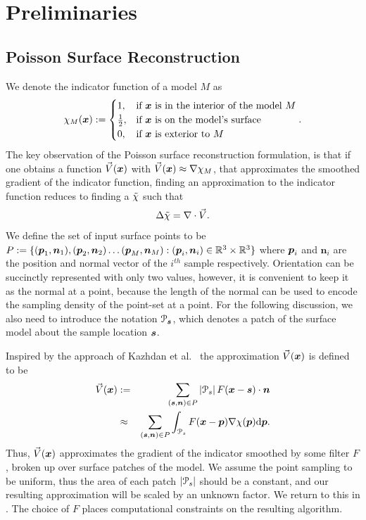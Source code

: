 \section{Preliminaries}\label{sec:pois_review}
\subsection{Poisson Surface Reconstruction}
We denote the indicator function of a model $M$ as $$ \chi_M(\boldsymbol{x}) :=
\begin{cases}
1, & \text{if }\boldsymbol{x}\text{ is in the interior of the model } M \\
\frac{1}{2}, & \text{if } \boldsymbol{x}\text{ is on the model's surface}\\
0, & \text{if }\boldsymbol{x}\text{ is exterior to } M
\end{cases}. $$
The key observation of the Poisson surface reconstruction formulation, is that if one obtains a function $\vec{V}(\boldsymbol{x})$ with $\vec{V}(\boldsymbol{x})\approx{\nabla}\chi_M$, that approximates the smoothed gradient of the indicator function, finding an approximation to the indicator function reduces to finding a $\tilde{\chi}$ such that {\small 
\begin{equation} \label{eq:poisson}
	\lapl{\inda} = {\grad} \cdot \vec{V}.
\end{equation}}
We define the set of input surface points to be $P:=\{(\boldsymbol{p}_1,\boldsymbol{n}_1), (\boldsymbol{p}_2,\boldsymbol{n}_2) \hdots (\boldsymbol{p}_M,\boldsymbol{n}_M) : (\boldsymbol{p}_i,\boldsymbol{n}_i) \in \mathbb{R}^3 \times \mathbb{R}^3 \}$ where $\boldsymbol{p}_i$ and $\mathbf{n}_i$ are the position and normal vector of the $i^{th}$ sample respectively. Orientation can be succinctly represented with only two values, however, it is convenient to keep it as the normal at a point, because the length of the normal can be used to encode the sampling density of the point-set at a point. For the following discussion, we also need to introduce the notation $\mathcal{P}_{\boldsymbol{s}}$, which denotes a patch of the surface model about the sample location $\boldsymbol{s}$. 

Inspired by the approach of Kazhdan et al.~\cite{Kazhdan06} the approximation $\vec{V}(\boldsymbol{x})$ is defined to be  {\small 
\begin{eqnarray}
	\vec{V}(\vx) & := & \sum_{(\vect{s},\vect{n}) \in P}\left|\patch_s\right|F(\vx-\vect{s})\cdot\vn \label{eq:vdef} \\
	 & \approx & \sum_{(\vect{s},\vect{n}) \in P} \int_{\patch_s}{F(\vect{x} - \vect{p}) \nabla \chi (\vect{p})} \mathrm{d} \vect{p}. \notag  
\end{eqnarray}}
Thus, $\vec{V}(\boldsymbol{x})$ approximates the gradient of the indicator smoothed by some filter $F$, broken up over surface patches of the model. We assume the point sampling to be uniform, thus the area of each patch $\left|\mathcal{P}_s\right|$ should be a constant, and our resulting approximation will be scaled by an unknown factor. We return to this in . The choice of $F$ places computational constraints on the resulting algorithm.

